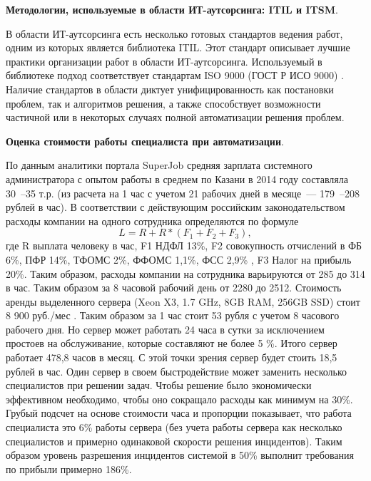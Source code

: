 \textbf{Методологии, используемые в области ИТ-аутсорсинга: ITIL и ITSM}. \par
В области ИТ-аутсорсинга есть несколько готовых стандартов ведения работ, одним из которых является библиотека ITIL. Этот стандарт описывает лучшие практики организации работ в области ИТ-аутсорсинга. Используемый в библиотеке подход соответствует стандартам ISO 9000 (ГОСТ Р ИСО 9000) \cite{ITIL1} \cite{ITIL2} \cite{ITIL3}.
Наличие стандартов в области диктует унифицированность как постановки проблем, так и алгоритмов решения, а также способствует возможности частичной или в некоторых случаях полной автоматизации решения проблем.  \par

\textbf{Оценка стоимости работы специалиста при автоматизации}.\par
По данным аналитики портала SuperJob \cite{SuperJob} средняя зарплата системного администратора с опытом работы в среднем по Казани в 2014 году составляла 30~--35 т.р. (из расчета на 1 час с учетом 21 рабочих дней в месяце~--- 179~--208 рублей в час). В соответствии с действующим российским законодательством \cite{FiscalCodecs} расходы компании на  одного сотрудника определяются по формуле
\[
L = R + R*(F_1 +F_2+F_3),
\]
где R выплата человеку в час, F1 НДФЛ 13\%, F2 совокупность отчислений в ФБ 6\%, ПФР 14\%, ТФОМС 2\%, ФФОМС 1,1\%, ФСС 2,9\% , F3 Налог на прибыль 20\%. 
Таким образом, расходы компании на сотрудника варьируются от 285 до 314 в час. Таким образом за 8 часовой рабочий день от 2280 до 2512. Стоимость аренды выделенного сервера (Xeon X3, 1.7 GHz, 8GB RAM, 256GB SSD) стоит 8 900 руб./мес \cite{TimeWeb}. Таким образом за 1 час стоит 53 рубля с учетом 8 часового рабочего дня. Но сервер может работать 24 часа в сутки за исключением простоев на обслуживание, которые составляют не более 5 \%. Итого сервер работает 478,8 часов в месяц. С этой точки зрения сервер будет стоить 18,5 рублей в час. Один сервер в своем быстродействие может заменить несколько специалистов при решении задач. Чтобы решение было экономически эффективном необходимо, чтобы оно сокращало расходы как минимум на 30\%. Грубый подсчет на основе стоимости часа и пропорции показывает, что работа специалиста это 6\% работы сервера (без учета работы сервера как несколько специалистов и примерно одинаковой скорости решения инцидентов). Таким образом уровень разрешения инцидентов системой в 50\% выполнит требования по прибыли примерно 186\%. 


